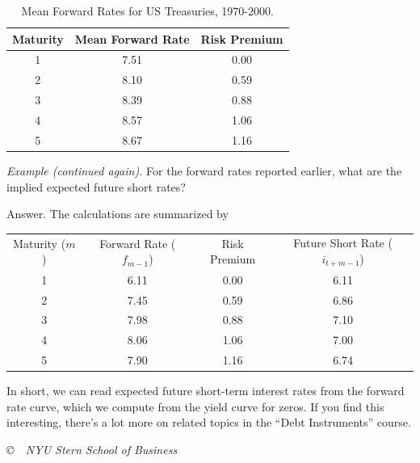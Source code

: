 \documentclass[letterpaper,12pt]{article}
\begin{document}
\begin{table}[h]
\centering
\begin{tabular}{ccc}
\hline\hline
        Maturity   &    Mean Forward Rate   &  Risk Premium \\
\hline\hline
            1  &  7.51 &  0.00 \\
            2  &  8.10 &  0.59 \\
            3  &  8.39 &  0.88 \\
            4  &  8.57 &  1.06 \\
            5  &  8.67 &  1.16  \\
\hline\hline
\end{tabular}
\caption{Mean Forward Rates for US Treasuries, 1970-2000.}
\label{tab:meanrates}
\end{table}


{\it Example (continued again).\/} For the forward rates reported
earlier, what are the implied expected future short rates?

Answer.  The calculations are summarized by
%
\begin{center}
\begin{tabular}{cccc}
  Maturity ($m$) & Forward Rate ($f_{m-1}$) & Risk Premium & Future Short Rate ($i_{t+m-1}$) \\
     1      &   6.11       &    0.00      &    6.11 \\
     2      &   7.45       &    0.59      &    6.86  \\
     3      &   7.98       &    0.88      &    7.10  \\
     4      &   8.06       &    1.06      &    7.00  \\
     5      &   7.90       &    1.16      &    6.74
\end{tabular}
\end{center}
%

In short, we can read expected future short-term interest rates
from the forward rate curve, which we compute from the yield curve
for zeros.  If you find this interesting, there's a lot more on
related topics in the ``Debt Instruments'' course.

\vfill \centerline{\it \copyright \ \number\year \  NYU Stern
School of Business}
\end{document}
